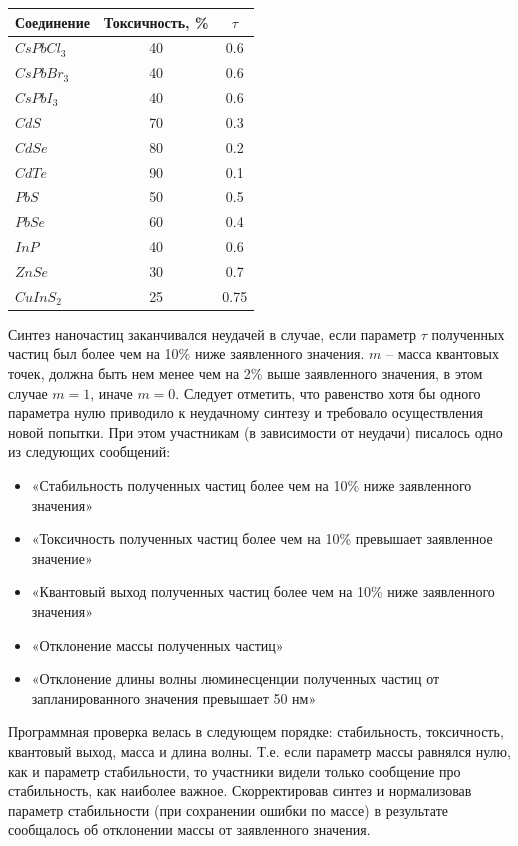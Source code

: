 \begin{table}[H]
	\begin{center}
		\begin{tabular}{|l|c|c|}
			\hline
			Соединение	&Токсичность, \% &$\tau$ \\
			\hline
			$CsPbCl_3$	&40&0.6 \\
			\hline
			$CsPbBr_3$	&40&	0.6 \\
			\hline
			$CsPbI_3$	&40	&0.6 \\
			\hline
			$CdS$	&70	&0.3 \\
			\hline
			$CdSe$	&80	&0.2 \\
			\hline
			$CdTe$	&90	&0.1 \\
			\hline
			$PbS$	&50&	0.5 \\
			\hline
			$PbSe$	&60&	0.4 \\
			\hline
			$InP$	&40	&0.6 \\
			\hline
			$ZnSe$&	30&	0.7 \\
			\hline
			$CuInS_2$&	25	&0.75 \\
			\hline
		\end{tabular}
	\end{center}
\end{table}

Синтез наночастиц заканчивался неудачей в случае, если параметр $\tau$ полученных частиц был более чем на 10\% ниже заявленного значения. $m$ – масса квантовых точек, должна быть нем менее чем на 2\% выше заявленного значения, в этом случае $m = 1$, иначе $m = 0$. Следует отметить, что равенство хотя бы одного параметра нулю приводило к неудачному синтезу и требовало осуществления новой попытки. При этом участникам (в зависимости от неудачи) писалось одно из следующих сообщений:

\begin{itemize}
	\item «Стабильность полученных частиц более чем на 10\% ниже заявленного значения»
	\item «Токсичность полученных частиц более чем на 10\% превышает заявленное значение»
	\item «Квантовый выход полученных частиц более чем на 10\% ниже заявленного значения»
	\item «Отклонение массы полученных частиц»
	\item «Отклонение длины волны люминесценции полученных частиц от запланированного значения превышает 50 нм»
\end{itemize}

Программная проверка велась в следующем порядке: стабильность, токсичность, квантовый выход, масса и длина волны. Т.е. если параметр массы равнялся нулю, как и параметр стабильности, то участники видели только сообщение про стабильность, как наиболее важное. Скорректировав синтез и нормализовав параметр стабильности (при сохранении ошибки по массе) в результате сообщалось об отклонении массы от заявленного значения.

